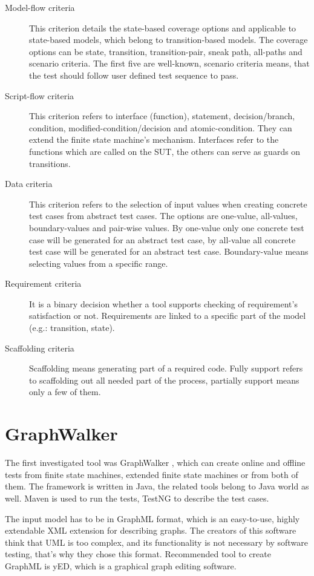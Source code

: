 \begin{description}
	\item[Model-flow criteria] This criterion details the state-based coverage options and applicable to state-based models, which belong to transition-based models. The coverage options can be state, transition, transition-pair, sneak path, all-paths and scenario criteria. The first five are well-known, scenario criteria means, that the test should follow user defined test sequence to pass.
	\item[Script-flow criteria] This criterion refers to interface (function), statement, decision/branch, condition, modified-condition/decision and atomic-condition. They can extend the finite state machine's mechanism. Interfaces refer to the functions which are called on the SUT, the others can serve as guards on transitions.
	\item[Data criteria] This criterion refers to the selection of input values when creating concrete test cases from abstract test cases. The options are one-value, all-values, boundary-values and pair-wise values. By one-value only one concrete test case will be generated for an abstract test case, by all-value all concrete test case will be generated for an abstract test case. Boundary-value means selecting values from a specific range.
	\item[Requirement criteria] It is a binary decision whether a tool supports checking of requirement's satisfaction or not. Requirements are linked to a specific part of the model (e.g.: transition, state).
	\item[Scaffolding criteria] Scaffolding means generating part of a required code. Fully support refers to scaffolding out all needed part of the process, partially support means only a few of them.
\end{description}

\section{GraphWalker}
\label{sec:graphwalker}

The first investigated tool was GraphWalker \cite{graphwalker}, which can create online and offline tests from finite state machines, extended finite state machines or from both of them. The framework is written in Java, the related tools belong to Java world as well. Maven is used to run the tests, TestNG to describe the test cases.

The input model has to be in GraphML format, which is an easy-to-use, highly extendable XML extension for describing graphs. The creators of this software think that UML is too complex, and its functionality is not necessary by software testing, that's why they chose this format. Recommended tool to create GraphML is yED, which is a graphical graph editing software.

